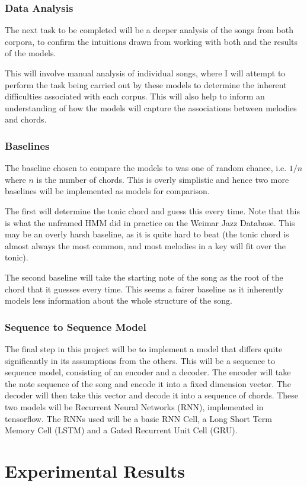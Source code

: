 \documentclass[bsc,singlespacing,parskip, deptreport]{infthesis}
\begin{document}
\subsection{Data Analysis}

The next task to be completed will be a deeper analysis of the songs from both corpora, to confirm the intuitions drawn from working with both and the results of the models.

This will involve manual analysis of individual songs, where I will attempt to perform the task being carried out by these models to determine the inherent difficulties associated with each corpus. This will also help to inform an understanding of how the models will capture the associations between melodies and chords. 

\subsection{Baselines}

The baseline chosen to compare the models to was one of random chance, i.e. $1/n$ where $n$ is the number of chords. This is overly simplistic and hence two more baselines will be implemented as models for comparison.

The first will determine the tonic chord and guess this every time. Note that this is what the unframed HMM did in practice on the Weimar Jazz Database. This may be an overly harsh baseline, as it is quite hard to beat (the tonic chord is almost always the most common, and most melodies in a key will fit over the tonic).

The second baseline will take the starting note of the song as the root of the chord that it guesses every time. This seems a fairer baseline as it inherently models less information about the whole structure of the song.

\subsection{Sequence to Sequence Model}

The final step in this project will be to implement a model that differs quite significantly in its assumptions from the others. This will be a sequence to sequence model, consisting of an encoder and a decoder. The encoder will take the note sequence of the song and encode it into a fixed dimension vector. The decoder will then take this vector and decode it into a sequence of chords. These two models will be Recurrent Neural Networks (RNN), implemented in tensorflow. The RNNs used will be a basic RNN Cell, a Long Short Term Memory Cell (LSTM) and a Gated Recurrent Unit Cell (GRU).

\chapter{Experimental Results}





\end{document}

